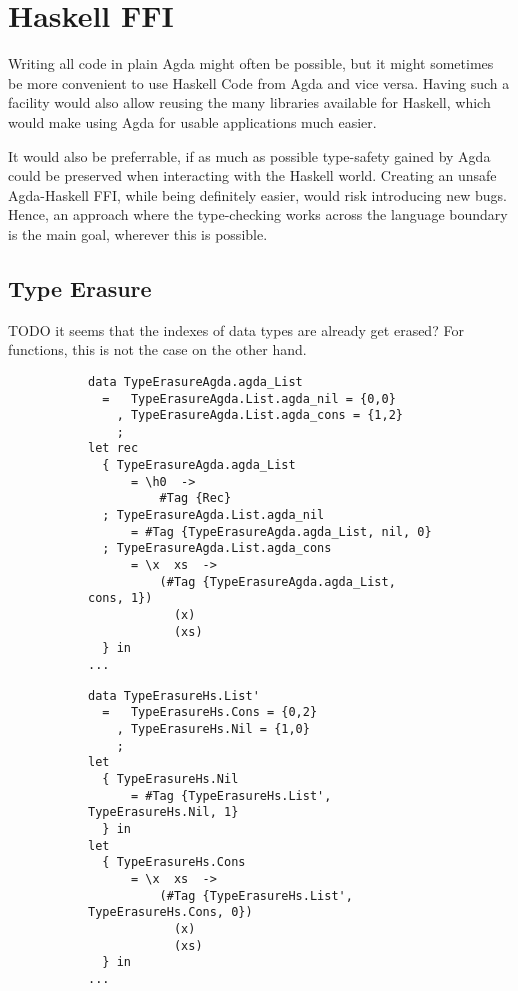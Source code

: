 \documentclass[12pt, a4paper, twoside]{report}
\begin{document}
\section{Haskell FFI}
Writing all code in plain Agda might often be possible, but it might sometimes be more
convenient to use Haskell Code from Agda and vice versa. Having such a facility would
also allow reusing the many libraries available for Haskell, which would make using Agda
for usable applications much easier.

It would also be preferrable, if as much as possible type-safety gained by Agda could be
preserved when interacting with the Haskell world. Creating an unsafe Agda-Haskell
FFI, while being definitely easier, would risk introducing new bugs. Hence, an approach
where the type-checking works across the language boundary is the main goal, wherever
this is possible.

\subsection{Type Erasure}

TODO it seems that the indexes of data types are already get erased?
For functions, this is not the case on the other hand.
\begin{landscape}
\begin{figure}
\begin{subfigure}[b]{0.5\linewidth}

\begin{lstlisting}
data TypeErasureAgda.agda_List
  =   TypeErasureAgda.List.agda_nil = {0,0}
    , TypeErasureAgda.List.agda_cons = {1,2}
    ;
let rec
  { TypeErasureAgda.agda_List
      = \h0  ->
          #Tag {Rec}
  ; TypeErasureAgda.List.agda_nil
      = #Tag {TypeErasureAgda.agda_List, nil, 0}
  ; TypeErasureAgda.List.agda_cons
      = \x  xs  ->
          (#Tag {TypeErasureAgda.agda_List, cons, 1})
            (x)
            (xs)
  } in
...
\end{lstlisting}
\end{subfigure}
\begin{subfigure}[b]{0.5\linewidth}

\begin{lstlisting}
data TypeErasureHs.List'
  =   TypeErasureHs.Cons = {0,2}
    , TypeErasureHs.Nil = {1,0}
    ;
let
  { TypeErasureHs.Nil
      = #Tag {TypeErasureHs.List', TypeErasureHs.Nil, 1}
  } in
let
  { TypeErasureHs.Cons
      = \x  xs  ->
          (#Tag {TypeErasureHs.List', TypeErasureHs.Cons, 0})
            (x)
            (xs)
  } in
...
\end{lstlisting}
\end{subfigure}
\end{figure}
\end{landscape}
\end{document}

